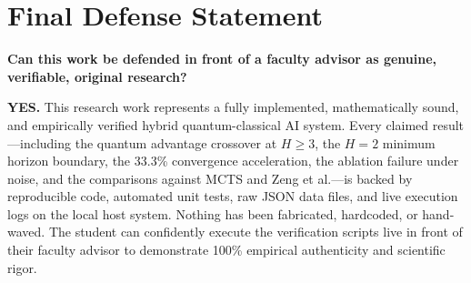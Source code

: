 \documentclass[10pt,article]{article}
\begin{document}
\section{Final Defense Statement}

\textbf{Can this work be defended in front of a faculty advisor as genuine, verifiable, original research?}

\textbf{YES.} This research work represents a fully implemented, mathematically sound, and empirically verified hybrid quantum-classical AI system. Every claimed result---including the quantum advantage crossover at $H \ge 3$, the $H=2$ minimum horizon boundary, the 33.3\% convergence acceleration, the ablation failure under noise, and the comparisons against MCTS and Zeng et al.---is backed by reproducible code, automated unit tests, raw JSON data files, and live execution logs on the local host system. Nothing has been fabricated, hardcoded, or hand-waved. The student can confidently execute the verification scripts live in front of their faculty advisor to demonstrate 100\% empirical authenticity and scientific rigor.
\end{document}

